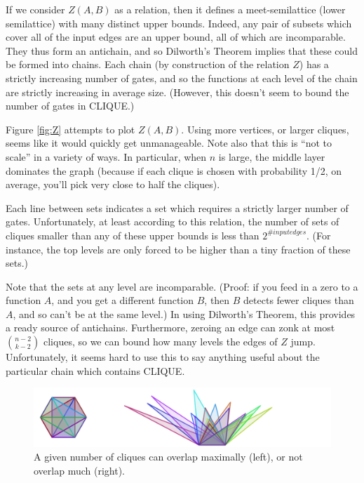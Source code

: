 \documentclass[12pt]{article}
\theoremstyle{definition}
\begin{document}
If we consider $Z(A, B)$ as a relation, then it defines a meet-semilattice
(lower semilattice) with 
many distinct upper bounds.  Indeed, any pair of subsets which
cover all of the input edges are an upper bound, all of which
are incomparable. They thus form an antichain, and so Dilworth's Theorem
implies that these could be formed into chains. Each chain (by construction
of the relation $Z$) has a strictly increasing number of gates, and so the
functions at each level of the chain are strictly increasing in average
size. (However, this doesn't seem to bound the number of gates in CLIQUE.)

Figure \ref{fig:Z} attempts to plot $Z(A,B)$. Using more vertices, or
larger cliques, seems like it would quickly get unmanageable.
Note also that this is ``not to scale'' in a variety of ways. In
particular, when $n$ is large, the middle layer dominates the graph
(because if each clique is chosen with probability 1/2, on average,
you'll pick very close to half the cliques).

Each line between sets indicates a set which requires a strictly larger number of gates.  Unfortunately, at least according to this relation,
the number of sets of cliques smaller than
any of these upper bounds is less than $2^{\# input edges}$.
(For instance, the top levels are only forced to be higher than
a tiny fraction of these sets.)

Note that the sets at any level are incomparable. (Proof: if you feed in
a zero to a function $A$, and you get a different function $B$, then $B$
detects fewer cliques than $A$, and so can't be at the same level.)
In using Dilworth's Theorem, this provides a ready source of antichains.
Furthermore, zeroing an edge
can zonk at most ${n-2} \choose {k-2}$ cliques, so we can bound how
many levels the edges of $Z$ jump. Unfortunately, it seems hard to use
this to say anything useful about the particular chain which contains CLIQUE.

\begin{figure}
\centering
\includegraphics[width=1\textwidth]{R/tri1.pdf}
\caption{A given number of cliques can overlap maximally (left),
or not overlap much (right).}
\label{fig:overlappingTriangles}
\end{figure}
\end{document}
